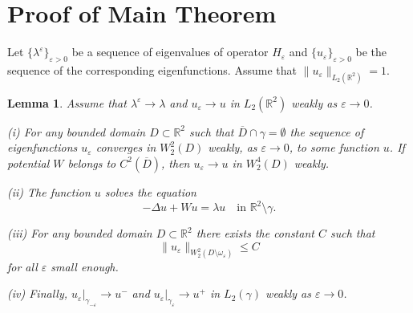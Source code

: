 \documentclass[reqno]{amsart}
\theoremstyle{plain}
\newtheorem{lem}{Lemma}
\numberwithin{equation}{section}
\newcommand{\Real}{\mathbb R}
\newcommand{\eps}{\varepsilon}
\renewcommand{\leq}{\leqslant}
\begin{document}
\vskip60pt

\section{Proof of Main Theorem}
Let $\{\lambda^\eps\}_{\eps>0}$ be a sequence of eigenvalues of operator $H_\eps$ and $\{u_\eps\}_{\eps>0}$ be the sequence of the corresponding eigenfunctions.
Assume that $\|u_\eps\|_{L_2(\Real^2)}=1$.

\begin{lem}
  Assume that $\lambda^\eps\to \lambda$ and $u_\eps\to u$ in $L_2(\Real^2)$ weakly as $\eps\to 0$.

  (i) For any bounded domain $D\subset \Real^2$ such that $\overline{D}\cap\gamma=\emptyset$ the sequence of eigenfunctions $u_\eps$ converges in $W_2^2(D)$ weakly, as $\eps\to 0$, to some function $u$. If potential $W$ belongs to $C^2(\overline{D})$, then $u_\eps\to u$ in $W_2^4(D)$ weakly.

  (ii) The function $u$ solves the equation
  \begin{equation}\label{EqnForUoutside}
  -\Delta u+Wu=\lambda u\quad \text{in } \Real^2\setminus \gamma.
  \end{equation}

  (iii)  For any bounded domain $D\subset \Real^2$ there exists the constant $C$ such that
 \begin{equation}\label{UepsW22OmegaEps}
   \|u_\eps\|_{W_2^2(D\setminus\omega_\eps)}\leq C
 \end{equation}
for all $\eps$ small enough.

 (iv) Finally, $u_\eps|_{\gamma_{-\eps}}\to u^-$ and  $u_\eps|_{\gamma_{\eps}}\to u^+$ in $L_2(\gamma)$ weakly as $\eps\to 0$.
\end{lem}
\end{document}
